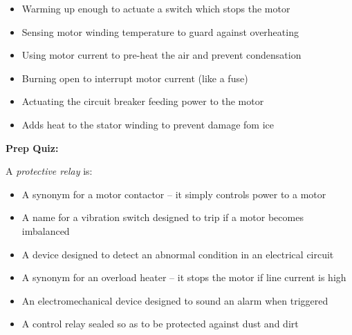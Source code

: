 \begin{itemize}
\item{} Warming up enough to actuate a switch which stops the motor
\vskip 5pt 
\item{} Sensing motor winding temperature to guard against overheating
\vskip 5pt 
\item{} Using motor current to pre-heat the air and prevent condensation
\vskip 5pt 
\item{} Burning open to interrupt motor current (like a fuse)
\vskip 5pt 
\item{} Actuating the circuit breaker feeding power to the motor
\vskip 5pt 
\item{} Adds heat to the stator winding to prevent damage fom ice
\end{itemize}












\vfil \eject

\noindent
{\bf Prep Quiz:}

A {\it protective relay} is:

\begin{itemize}
\item{} A synonym for a motor contactor -- it simply controls power to a motor
\vskip 5pt 
\item{} A name for a vibration switch designed to trip if a motor becomes imbalanced
\vskip 5pt 
\item{} A device designed to detect an abnormal condition in an electrical circuit
\vskip 5pt 
\item{} A synonym for an overload heater -- it stops the motor if line current is high
\vskip 5pt 
\item{} An electromechanical device designed to sound an alarm when triggered
\vskip 5pt 
\item{} A control relay sealed so as to be protected against dust and dirt
\end{itemize}




